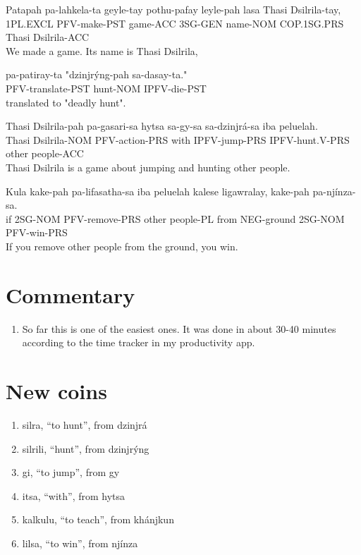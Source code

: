 \documentclass{thiguka}
\begin{document}
\begin{exe}
\ex{} \gll{}Patapah  pa-lahkela-ta geyle-tay pothu-pafay leyle-pah lasa        Thasi Dsilrila-tay,\\
            1PL.EXCL PFV-make-PST  game-ACC  3SG-GEN     name-NOM  COP.1SG.PRS Thasi Dsilrila-ACC\\
      \glt{}We made a game. Its name is Thasi Dsilrila,
\end{exe}

\begin{exe}
\ex{} \gll{}pa-patiray-ta     "dzinjrýng-pah sa-dasay-ta."\\
            PFV-translate-PST  hunt-NOM      IPFV-die-PST\\
      \glt{}translated to "deadly hunt".
\end{exe}

\begin{exe}   
\ex{} \gll{}Thasi Dsilrila-pah pa-gasari-sa   hytsa sa-gy-sa      sa-dzinjrá-sa   iba   peluelah.\\
            Thasi Dsilrila-NOM PFV-action-PRS with  IPFV-jump-PRS IPFV-hunt.V-PRS other people-ACC\\
      \glt{}Thasi Dsilrila is a game about jumping and hunting other people.
\end{exe}

\begin{exe}
\ex{} \gll{}Kula kake-pah pa-lifasatha-sa iba   peluelah  kalese ligawralay, kake-pah pa-njínza-sa.\\
            if   2SG-NOM  PFV-remove-PRS  other people-PL from   NEG-ground  2SG-NOM  PFV-win-PRS\\
      \glt{}If you remove other people from the ground, you win.
\end{exe}

\section{Commentary}
\begin{enumerate}
    \item So far this is one of the easiest ones. It was done in about 30-40 minutes according to the time tracker in my productivity app.
\end{enumerate}

\newpage

\section{New coins}
\begin{enumerate}
    \item silra, ``to hunt'', from dzinjrá
    \item silrili, ``hunt'', from dzinjrýng
    \item gi, ``to jump'', from gy
    \item itsa, ``with'', from hytsa
    \item kalkulu, ``to teach'', from khánjkun
    \item lilsa, ``to win'', from njínza
\end{enumerate}
\end{document}
